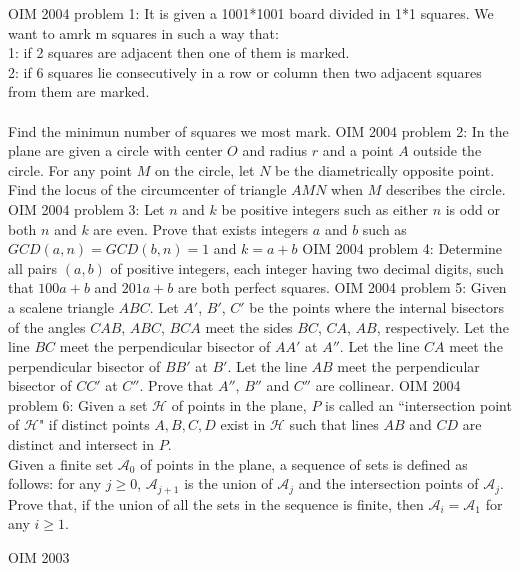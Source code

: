 OIM 2004 problem 1:  It is given a 1001*1001 board divided in 1*1 squares. We want to amrk m squares in such a way that: \\
1: if 2 squares are adjacent then one of them is marked. \\
2: if 6 squares lie consecutively in a row or column then two adjacent squares from them are marked. \\\\
Find the minimun number of squares we most mark. 
OIM 2004 problem 2:  In the plane are given a circle with center $ O$ and radius $ r$ and a point $ A$ outside the circle. For any point $ M$ on the circle, let $ N$ be the diametrically opposite point. Find the locus of the circumcenter of triangle $ AMN$ when $ M$ describes the circle. 
OIM 2004 problem 3:  Let $ n$ and $ k$ be positive integers such as either $ n$ is odd or both $ n$ and $ k$ are even. Prove that exists integers $ a$ and $ b$ such as $ GCD(a,n) = GCD(b,n) = 1$ and $ k = a + b$ 
OIM 2004 problem 4:  Determine all pairs $ (a,b)$ of positive integers, each integer having two decimal digits, such that $ 100a+b$ and $ 201a+b$ are both perfect squares. 
OIM 2004 problem 5:  Given a scalene triangle $ ABC$. Let $ A'$, $ B'$, $ C'$ be the points where the internal bisectors of the angles $ CAB$, $ ABC$, $ BCA$ meet the sides $ BC$, $ CA$, $ AB$, respectively. Let the line $ BC$ meet the perpendicular bisector of $ AA'$ at $ A''$. Let the line $ CA$ meet the perpendicular bisector of $ BB'$ at $ B'$. Let the line $ AB$ meet the perpendicular bisector of $ CC'$ at $ C''$. Prove that $ A''$, $ B''$ and $ C''$ are collinear. 
OIM 2004 problem 6:  Given a set $ \mathcal{H}$ of points in the plane, $ P$ is called an ``intersection point of $ \mathcal{H}$" if distinct points $ A,B,C,D$ exist in $ \mathcal{H}$ such that lines $ AB$ and $ CD$ are distinct and intersect in $ P$. \\
Given a finite set $ \mathcal{A}_0$ of points in the plane, a sequence of sets is defined as follows: for any $ j\geq0$, $ \mathcal{A}_{j+1}$ is the union of $ \mathcal{A}_j$ and the intersection points of $ \mathcal{A}_j$. \\
Prove that, if the union of all the sets in the sequence is finite, then $ \mathcal{A}_i=\mathcal{A}_1$ for any $ i\geq1$. 

OIM 2003 

